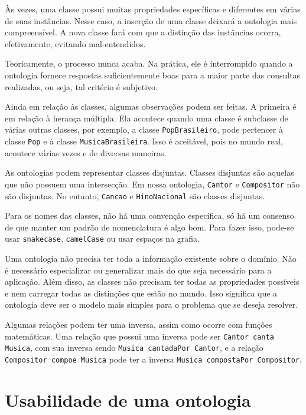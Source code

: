 Às vezes, uma classe possui muitas propriedades específicas e diferentes em várias de suas instâncias. Nesse caso, a inserção de uma classe deixará a ontologia mais compreensível. A nova classe fará com que a distinção das instâncias ocorra, efetivamente, evitando mal-entendidos.

Teoricamente, o processo nunca acaba. Na prática, ele é interrompido quando a ontologia fornece respostas suficientemente boas para a maior parte das consultas realizadas, ou seja, tal critério é subjetivo.

Ainda em relação às classes, algumas observações podem ser feitas. A primeira é em relação à herança múltipla. Ela acontece quando uma classe é subclasse de várias outras classes, por exemplo, a classe \texttt{PopBrasileiro}, pode pertencer à classe \texttt{Pop} e à classe \texttt{MusicaBrasileira}. Isso é aceitável, pois no mundo real, acontece várias vezes e de diversas maneiras.

As ontologias podem representar classes disjuntas. Classes disjuntas são aquelas que não possuem uma intersecção. Em nossa ontologia, \texttt{Cantor} e \texttt{Compositor} não são disjuntas. No entanto, \texttt{Cancao} e \texttt{HinoNacional} são classes disjuntas.

Para os nomes das classes, não há uma convenção específica, só há um consenso de que manter um padrão de nomenclatura é algo bom. Para fazer isso, pode-se usar \texttt{snake\textunderscore case}, \texttt{camelCase} ou usar espaços na grafia.

Uma ontologia não precisa ter toda a informação existente sobre o domínio. Não é necessário especializar ou generalizar mais do que seja necessário para a aplicação. Além disso, as classes não precisam ter todas as propriedades possíveis e nem carregar todas as distinções que estão no mundo. Isso significa que a ontologia deve ser o modelo mais simples para o problema que se deseja resolver.

Algumas relações podem ter uma inversa, assim como ocorre com funções matemáticas. Uma relação que possui uma inversa pode ser \texttt{Cantor canta Musica}, com sua inversa sendo \texttt{Musica cantadaPor Cantor}, e a relação \texttt{Compositor compoe Musica} pode ter a inversa \texttt{Musica compostaPor Compositor}.

\section{Usabilidade de uma ontologia}

